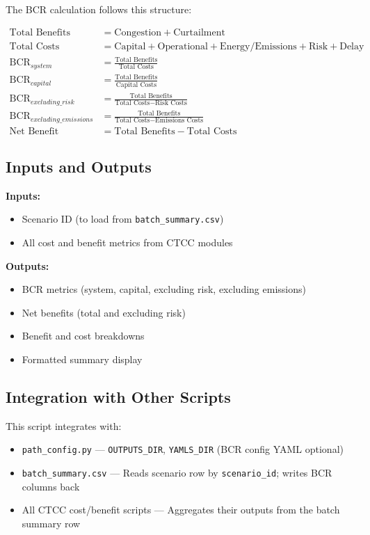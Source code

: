 \documentclass[ctcc_full_documentation.tex]{subfiles}
\begin{document}
The BCR calculation follows this structure:

\begin{align}
\text{Total Benefits} &= \text{Congestion} + \text{Curtailment} \\
\text{Total Costs} &= \text{Capital} + \text{Operational} + \text{Energy/Emissions} + \text{Risk} + \text{Delay} \\
\text{BCR}_{system} &= \frac{\text{Total Benefits}}{\text{Total Costs}} \\
\text{BCR}_{capital} &= \frac{\text{Total Benefits}}{\text{Capital Costs}} \\
\text{BCR}_{excluding\_risk} &= \frac{\text{Total Benefits}}{\text{Total Costs} - \text{Risk Costs}} \\
\text{BCR}_{excluding\_emissions} &= \frac{\text{Total Benefits}}{\text{Total Costs} - \text{Emissions Costs}} \\
\text{Net Benefit} &= \text{Total Benefits} - \text{Total Costs}
\end{align}

\subsection{Inputs and Outputs}

\textbf{Inputs:}
\begin{itemize}
    \item Scenario ID (to load from \texttt{batch\_summary.csv})
    \item All cost and benefit metrics from CTCC modules
\end{itemize}

\textbf{Outputs:}
\begin{itemize}
    \item BCR metrics (system, capital, excluding risk, excluding emissions)
    \item Net benefits (total and excluding risk)
    \item Benefit and cost breakdowns
    \item Formatted summary display
\end{itemize}

\subsection{Integration with Other Scripts}

This script integrates with:
\begin{itemize}
    \item \texttt{path\_config.py} --- \texttt{OUTPUTS\_DIR}, \texttt{YAMLS\_DIR} (BCR config YAML optional)
    \item \texttt{batch\_summary.csv} --- Reads scenario row by \texttt{scenario\_id}; writes BCR columns back
    \item All CTCC cost/benefit scripts --- Aggregates their outputs from the batch summary row
\end{itemize}
\end{document}
